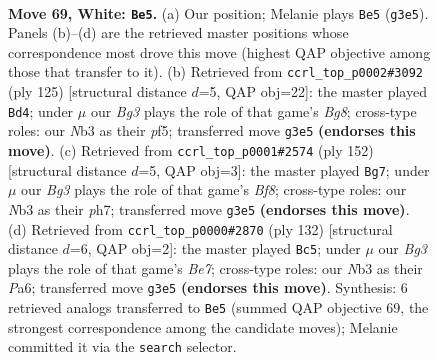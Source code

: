 \documentclass[11pt]{article}
\begin{document}
\clearpage

\begin{figure}[p]\centering
\begin{subfigure}{0.46\textwidth}\centering
\resizebox{\linewidth}{!}{%
\newchessgame
\chessboard[
  setfen={6k1/2P5/2r5/8/8/1N1K2B1/8/8 w - - 51 69},
  showmover=false,
  pgfstyle=straightmove, color=movearrow, markmove={g3-e5}
]}
\caption{}
\end{subfigure}\hfill
\begin{subfigure}{0.46\textwidth}\centering
\resizebox{\linewidth}{!}{%
\newchessgame
\chessboard[
  setfen={8/5k2/2R5/2p2P2/8/8/4K3/6b1 b - - 8 63},
  showmover=false,
  pgfstyle=straightmove, color=movearrow, markmove={g1-d4}
]}
\caption{}
\end{subfigure}
\\[4pt]
\begin{subfigure}{0.46\textwidth}\centering
\resizebox{\linewidth}{!}{%
\newchessgame
\chessboard[
  setfen={5B2/7p/r6P/5k2/3K4/8/8/8 w - - 13 77},
  showmover=false,
  pgfstyle=straightmove, color=movearrow, markmove={f8-g7}
]}
\caption{}
\end{subfigure}\hfill
\begin{subfigure}{0.46\textwidth}\centering
\resizebox{\linewidth}{!}{%
\newchessgame
\chessboard[
  setfen={r7/3kB3/P7/8/1P6/8/1K6/8 w - - 3 67},
  showmover=false,
  pgfstyle=straightmove, color=movearrow, markmove={e7-c5}
]}
\caption{}
\end{subfigure}
\caption{\textbf{Move 69, White: \texttt{Be5}.} (a) Our position; Melanie plays \texttt{Be5} (\texttt{g3e5}). Panels (b)--(d) are the retrieved master positions whose correspondence most drove this move (highest QAP objective among those that transfer to it). (b) Retrieved from \texttt{ccrl\_top\_p0002\#3092} (ply 125) [structural distance $d$=5, QAP obj=22]: the master played \texttt{Bd4}; under $\mu$ our \emph{Bg3} plays the role of that game's \emph{Bg8}; cross-type roles: our \emph{N}b3 as their \emph{p}f5; transferred move \texttt{g3e5} \textbf{(endorses this move)}. (c) Retrieved from \texttt{ccrl\_top\_p0001\#2574} (ply 152) [structural distance $d$=5, QAP obj=3]: the master played \texttt{Bg7}; under $\mu$ our \emph{Bg3} plays the role of that game's \emph{Bf8}; cross-type roles: our \emph{N}b3 as their \emph{p}h7; transferred move \texttt{g3e5} \textbf{(endorses this move)}. (d) Retrieved from \texttt{ccrl\_top\_p0000\#2870} (ply 132) [structural distance $d$=6, QAP obj=2]: the master played \texttt{Bc5}; under $\mu$ our \emph{Bg3} plays the role of that game's \emph{Be7}; cross-type roles: our \emph{N}b3 as their \emph{P}a6; transferred move \texttt{g3e5} \textbf{(endorses this move)}. Synthesis: 6 retrieved analogs transferred to \texttt{Be5} (summed QAP objective 69, the strongest correspondence among the candidate moves); Melanie committed it via the \texttt{search} selector.}
\label{fig:thought-m136}
\end{figure}
\end{document}
